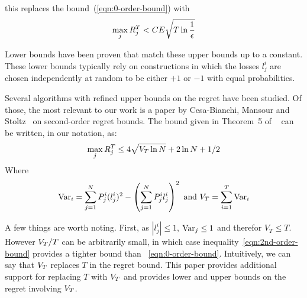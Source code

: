 \documentclass{article}[12pt]
\begin{document}
this replaces the bound~(\ref{eqn:0-order-bound}) with 
\begin{equation} \label{eqn:0-epsilon-order-bound}
  \max_j R_j^T < C E \sqrt{T \ln \frac{1}{\epsilon}}
\end{equation}

Lower bounds have been proven that match these upper bounds up to a
constant. These lower bounds typically rely on constructions in which
the losses $l_j^i$ are chosen independently at random to be either
$+1$ or $-1$ with equal probabilities.



Several algorithms with refined upper bounds on the regret have been
studied. Of those, the most relevant to our work is a paper by 
Cesa-Bianchi, Mansour and
Stoltz~\cite{cesa2007improved} on second-order regret bounds.
The bound given in Theorem~5 of ~\cite{cesa2007improved} can be
written, in our notation, as:
\begin{equation} \label{eqn:2nd-order-bound}
  \max_j R_j^T \leq 4\sqrt{V_T \ln N} +2 \ln N +1/2 
\end{equation}
Where
\[
  \mbox{Var}_i = \sum_{j=1}^N P^i_j (l_j^i)^2 -  \left( \sum_{j=1}^N P^i_j
    l_j^i \right)^2 \mbox{ and } V_T= \sum_{i=1}^T \mbox{Var}_i
\]

A few things are worth noting. First, as $|l_j^i|\leq 1$,
$\mbox{Var}_j\leq 1$ and therefor $V_T\leq T$. However $V_T/T$ can be
arbitrarily small, in which case inequality~\ref{eqn:2nd-order-bound}
provides a tighter bound than ~\ref{eqn:0-order-bound}. Intuitively,
we can say that $V_T$ replaces $T$ in the regret bound. This paper
provides additional support for replacing $T$ with $V_T$ and provides
lower and upper bounds on the regret involving $V_T$.
\end{document}
